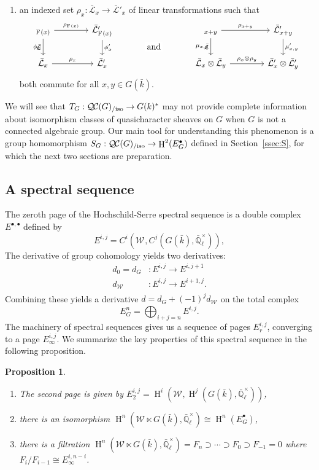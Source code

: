 \documentclass{amsart}
\makeatletter
\theoremstyle{plain}
\newtheorem{proposition}[theorem]{Proposition}
\theoremstyle{definition}
\theoremstyle{remark}
\newcommand{\EE}{\mathbb{\bar Q}_\ell}
\newcommand{\bFq}{\bar{k}}
\newcommand{\Fq}{k}
\newcommand{\EEx}{\EE^\times}
\newcommand{\Weil}[1]{\mathcal{W}_{#1}}
\newcommand{\Frob}[1]{\operatorname{F}_{#1}}
\DeclareMathOperator{\Hh}{H}
\newcommand{\gqcs}[1]{{\mathcal{\bar #1}}}
\newcommand{\QC}{{\mathcal{Q\hskip-0.8pt C}}}
\newcommand{\QCiso}[1]{\QC(#1)_{/\text{iso}}}
\newcommand{\labitem}[2]{
\def\@itemlabel{\textbf{#1}}
\item
\def\@currentlabel{#1}\label{#2}}
\makeatother
\begin{document}
\begin{enumerate}
 \labitem{(qc.4)}{qc.4} an indexed set $\rho_x : \gqcs{L}_x \to \gqcs{L'}_x$
  of linear transformations such that
  \[
   \begin{tikzcd}[column sep=40]
    \arrow[swap]{d}{\phi_x} \gqcs{L}_{\Frob{}(x)} \rar{\rho_{\Frob{}(x)}} & \gqcs{L'}_{\Frob{}(x)} \dar{\phi_x'}
    &\arrow[draw=none]{d}[pos=.4,description]{\text{\normalsize{and}}}
    & \arrow[swap]{d}{\mu_{x,y}} \gqcs{L}_{x+y} \rar{\rho_{x+y}} & \gqcs{L'}_{x+y} \dar{\mu'_{x,y}} \\
    \gqcs{L}_x \rar{\rho_x} & \gqcs{L'}_x
    & {} & \gqcs{L}_x\otimes\gqcs{L}_y \rar{\rho_x\otimes\rho_y} & \gqcs{L'}_x \otimes\gqcs{L'}_y
   \end{tikzcd}
  \]
  both commute for all $x, y \in G(\bFq)$.
\end{enumerate}

We will see that $T_G : \QCiso{G} \to G(\Fq)^*$ may not provide complete
information about isomorphism classes of quasicharacter sheaves on $G$ when $G$ is not a connected algebraic group.
Our main tool for understanding this phenomenon
is a group homomorphism $S_G: \QCiso{G} \to \Hh^2(E^\bullet_G)$ defined in Section~\ref{ssec:S}, for which the next two sections are preparation.

\subsection{A spectral sequence}\label{ssec:E}

The zeroth page of the Hochschild-Serre spectral sequence is a double complex $E^{\bullet, \bullet}$ defined by
\[
E^{i,j} = C^i(\Weil{}, C^j(G(\bFq), \EEx)),
\]
The derivative of group cohomology yields two derivatives:
\begin{align*}
d_0 = d_G &: E^{i,j} \to E^{i,j+1} \\
d_{\Weil{}} &: E^{i,j} \to E^{i+1,j}.
\end{align*}
Combining these yields a derivative $d = d_G + (-1)^j d_{\Weil{}}$ on the total complex
\[
E^n_G = \bigoplus_{i+j=n} E^{i,j}.
\]
The machinery of spectral sequences gives us a sequence of pages $E_r^{i,j}$, converging to a page $E_{\infty}^{i,j}$. We summarize the key properties of this spectral sequence in the following proposition.

\begin{proposition}
\begin{enumerate}
\item The second page is given by $E_2^{i,j} = \Hh^i(\Weil{}, \Hh^j(G(\bFq), \EEx))$,
\item there is an isomorphism $\Hh^n(\Weil{} \ltimes G(\bFq), \EEx) \cong \Hh^n(E_G^\bullet)$,
\item there is a filtration $\Hh^n(\Weil{} \ltimes G(\bFq), \EEx) = F_n \supset \cdots \supset F_0 \supset F_{-1} = 0$ where $F_i / F_{i-1} \cong E_{\infty}^{i, n-i}$.
\end{enumerate}
\end{proposition}
\end{document}
